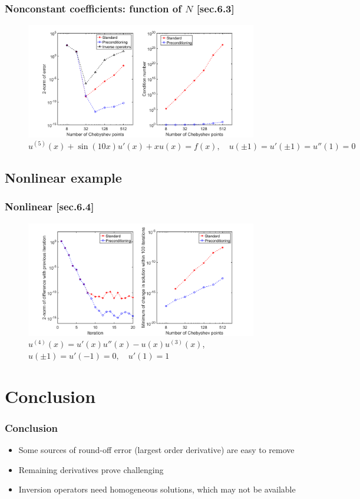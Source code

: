\documentclass{beamer}
\begin{document}
\begin{frame}
\frametitle{Nonconstant coefficients: function of $N$ [sec.6.3]}
\begin{figure}
\includegraphics[width=0.9\textwidth]{example_Wang5th_N.png}
\caption{$u^{(5)}(x) + \sin(10x) u'(x) + x u(x) = f(x), \quad u(\pm 1) = u'(\pm 1) = u''(1) = 0$}
\end{figure}
\end{frame}

\subsection{Nonlinear example}

\begin{frame}
\frametitle{Nonlinear [sec.6.4]}
\begin{figure}
\includegraphics[width=0.9\textwidth]{example_AscherNonlinear.png}
\caption{ $u^{(4)}(x) = u'(x) u''(x) - u(x) u^{(3)}(x)$, $ u(\pm 1) = u'(-1) = 0, \quad u'(1) = 1 $}
\end{figure}
\end{frame}

\section{Conclusion}

\begin{frame}
\frametitle{Conclusion}
\begin{itemize}
\item Some sources of round-off error (largest order derivative) are easy to remove
\item Remaining derivatives prove challenging
\item Inversion operators need homogeneous solutions, which may not be available
\end{itemize}
\end{frame}
\end{document}
